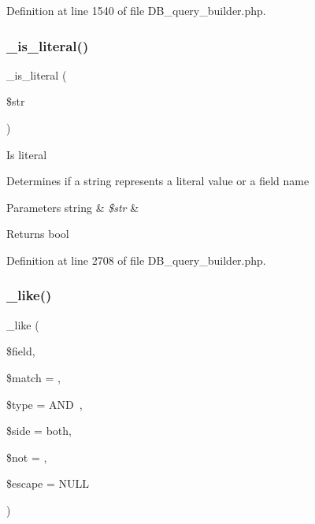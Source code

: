 Definition at line 1540 of file D\+B\+\_\+query\+\_\+builder.\+php.

\mbox{\label{class_c_i___d_b__query__builder_a645d9af97f1d078041e8ae451fae9e1b}} 
\subsubsection{\texorpdfstring{\_is\_literal()}{\_is\_literal()}}
{\footnotesize\ttfamily \+\_\+is\+\_\+literal (\begin{DoxyParamCaption}\item[{}]{\$str }\end{DoxyParamCaption})\hspace{0.3cm}{\ttfamily [protected]}}

Is literal

Determines if a string represents a literal value or a field name


\begin{DoxyParams}[1]{Parameters}
string & {\em \$str} & \\
\hline
\end{DoxyParams}
\begin{DoxyReturn}{Returns}
bool 
\end{DoxyReturn}


Definition at line 2708 of file D\+B\+\_\+query\+\_\+builder.\+php.

\mbox{\label{class_c_i___d_b__query__builder_abe8f3477d4b15bf422fc52ba753056b5}} 
\subsubsection{\texorpdfstring{\_like()}{\_like()}}
{\footnotesize\ttfamily \+\_\+like (\begin{DoxyParamCaption}\item[{}]{\$field,  }\item[{}]{\$match = {\ttfamily \textquotesingle{}\textquotesingle{}},  }\item[{}]{\$type = {\ttfamily \textquotesingle{}AND~\textquotesingle{}},  }\item[{}]{\$side = {\ttfamily \textquotesingle{}both\textquotesingle{}},  }\item[{}]{\$not = {\ttfamily \textquotesingle{}\textquotesingle{}},  }\item[{}]{\$escape = {\ttfamily NULL} }\end{DoxyParamCaption})\hspace{0.3cm}{\ttfamily [protected]}}

